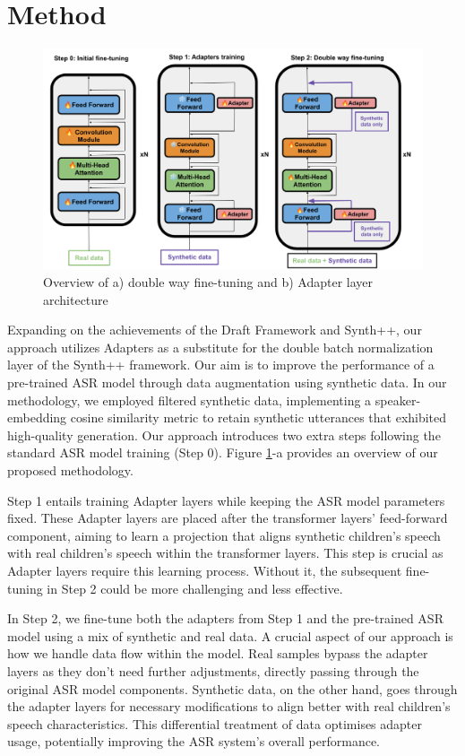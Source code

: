 \section{Method}
\begin{figure}
    \centering
    \includegraphics[width=\textwidth]{imgs/Overall_system.png}
    \caption{Overview of a) double way fine-tuning and b) Adapter layer architecture}
    \label{fig:overall}
\end{figure}

Expanding on the achievements of the Draft Framework and Synth++, our approach utilizes Adapters as a substitute for the double batch normalization layer of the Synth++ framework. Our aim is to improve the performance of a pre-trained ASR model through data augmentation using synthetic data. In our methodology, we employed filtered synthetic data, implementing a speaker-embedding cosine similarity metric to retain synthetic utterances that exhibited high-quality generation. Our approach introduces two extra steps following the standard ASR model training (Step 0).%
Figure \ref{fig:overall}-a provides an overview of our proposed methodology.

Step 1 entails training Adapter layers while keeping the ASR model parameters fixed. These Adapter layers are placed after the transformer layers' feed-forward component, aiming to learn a projection that aligns synthetic children's speech with real children's speech within the transformer layers. This step is crucial as Adapter layers require this learning process. Without it, the subsequent fine-tuning in Step 2 could be more challenging and less effective.

In Step 2, we fine-tune both the adapters from Step 1 and the pre-trained ASR model using a mix of synthetic and real data. A crucial aspect of our approach is how we handle data flow within the model. Real samples bypass the adapter layers as they don't need further adjustments, directly passing through the original ASR model components. Synthetic data, on the other hand, goes through the adapter layers for necessary modifications to align better with real children's speech characteristics. This differential treatment of data optimises adapter usage, potentially improving the ASR system's overall performance.


